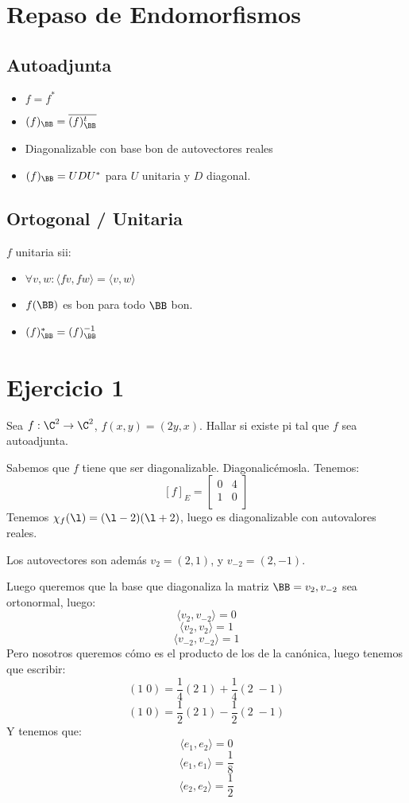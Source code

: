 \documentclass{article}
\begin{document}
\section*{Repaso de Endomorfismos}
\subsection*{Autoadjunta}
\begin{itemize}
    \item $f = f^*$
    \item $(f)_\BB = \overline {(f)_\BB^t}$
    \item Diagonalizable con base bon de autovectores reales
    \item $(f)_\BB = UDU^*$ para $U$ unitaria y $D$ diagonal.
\end{itemize}
\subsection*{Ortogonal / Unitaria}
$f$ unitaria sii:
\begin{itemize}
    \item $\forall v,w : \langle fv, fw \rangle = \langle v, w\rangle$
    \item $f(\BB)$ es bon para todo $\BB$ bon.
    \item $(f)_\BB^* = (f)_\BB^{-1}$
\end{itemize}
\section*{Ejercicio 1}
Sea $f : \C^2 \to \C^2$, $f(x,y) = (2y,x)$. Hallar si existe pi tal que $f$ sea autoadjunta.

\begin{demo}
    Sabemos que $f$ tiene que ser diagonalizable. Diagonalicémosla.
    Tenemos:
    \[
        [f]_E =
        \begin{bmatrix}
            0 & 4 \\
            1 & 0 \\
        \end{bmatrix}
    \]
    Tenemos $\chi_f(\l) = (\l-2)(\l+2)$, luego es diagonalizable con autovalores reales.

    Los autovectores son además $v_{2} = (2,1)$, y $v_{-2} = (2,-1)$.

    Luego queremos que la base que diagonaliza la matriz $\BB = {v_2, v_{-2}}$ sea ortonormal, luego:
    \[\langle v_2, v_{-2} \rangle = 0\]
    \[\langle v_2, v_2 \rangle = 1\]
    \[\langle v_{-2}, v_{-2} \rangle = 1\]
    Pero nosotros queremos cómo es el producto de los de la canónica, luego tenemos que escribir:
    \[(1 \; 0) = \frac{1}{4}(2 \; 1) + \frac{1}{4}(2 \; -1)\]
    \[(1 \; 0) = \frac{1}{2}(2 \; 1) - \frac{1}{2}(2 \; -1)\]
    Y tenemos que:
    \[\langle e_1, e_2\rangle = 0\]
    \[\langle e_1, e_1\rangle = \frac{1}{8}\]
    \[\langle e_2, e_2\rangle = \frac{1}{2}\]
\end{demo}
\end{document}
